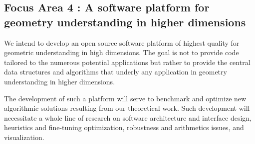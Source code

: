 
\subsection*{Focus Area 4 : A software platform for geometry understanding in higher
  dimensions}
We intend to develop an open source software platform of highest
quality %
for geometric understanding in high dimensions.  The goal
is not to provide code tailored to the numerous potential applications but
rather to provide the central data structures and algorithms that
underly any application in geometry understanding in higher
dimensions.

The development of such a platform will serve to benchmark and
optimize new algorithmic solutions resulting from our theoretical
work. Such development will 
 necessitate a whole line of research on software architecture and
interface design, heuristics and fine-tuning optimization, robustness
and arithmetics issues, and visualization.
%
%
%
